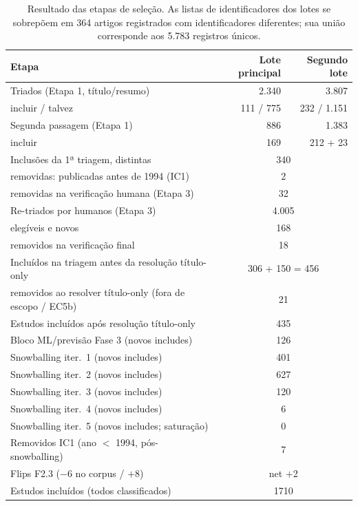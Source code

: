 \documentclass[preprint,12pt,authoryear=false]{elsarticle}
\begin{document}
\begin{table}[t]
\centering\small
\caption{Resultado das etapas de seleção. As listas de identificadores dos lotes se sobrepõem em 364 artigos registrados com identificadores diferentes; sua união corresponde aos 5.783 registros únicos.}\label{tab:selection}
\footnotesize
\begin{tabular}{lrr}
\toprule
Etapa & Lote principal & Segundo lote \\
\midrule
Triados (Etapa 1, título/resumo) & 2.340 & 3.807 \\
\quad incluir / talvez & 111 / 775 & 232 / 1.151 \\
Segunda passagem (Etapa 1) & 886 & 1.383 \\
\quad incluir & 169 & 212 + 23 \\
\midrule
Inclusões da 1ª triagem, distintas & \multicolumn{2}{c}{340} \\
\quad removidas: publicadas antes de 1994 (IC1) & \multicolumn{2}{c}{2} \\
\quad removidas na verificação humana (Etapa 3) & \multicolumn{2}{c}{32} \\
Re-triados por humanos (Etapa 3) & \multicolumn{2}{c}{4.005} \\
\quad elegíveis e novos & \multicolumn{2}{c}{168} \\
\quad removidos na verificação final & \multicolumn{2}{c}{18} \\
\midrule
Incluídos na triagem antes da resolução título-only & \multicolumn{2}{c}{306 + 150 = 456} \\
\quad removidos ao resolver título-only (fora de escopo / EC5b) & \multicolumn{2}{c}{21} \\
Estudos incluídos após resolução título-only & \multicolumn{2}{c}{435} \\
Bloco ML/previsão Fase 3 (novos includes) & \multicolumn{2}{c}{126} \\
Snowballing iter.~1 (novos includes) & \multicolumn{2}{c}{401} \\
Snowballing iter.~2 (novos includes) & \multicolumn{2}{c}{627} \\
Snowballing iter.~3 (novos includes) & \multicolumn{2}{c}{120} \\
Snowballing iter.~4 (novos includes) & \multicolumn{2}{c}{6} \\
Snowballing iter.~5 (novos includes; saturação) & \multicolumn{2}{c}{0} \\
Removidos IC1 (ano $<$ 1994, pós-snowballing) & \multicolumn{2}{c}{7} \\
Flips F2.3 ($-$6 no corpus / $+$8) & \multicolumn{2}{c}{net $+$2} \\
Estudos incluídos (todos classificados) & \multicolumn{2}{c}{1710} \\
\bottomrule
\end{tabular}
\end{table}
\end{document}
